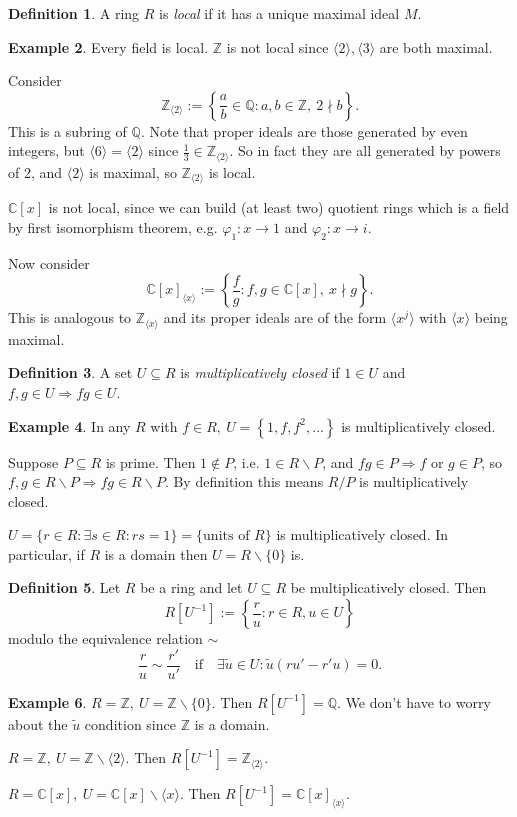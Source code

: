 \documentclass[a4paper]{article}
\newcommand{\la}{\langle}
\newcommand{\ra}{\rangle}
\newcommand{\Z}{\mathbb Z}
\newcommand{\Q}{\mathbb Q}
\newcommand{\C}{\mathbb C}
\theoremstyle{definition}
\newtheorem{defn}{Definition}[subsection]
\newtheorem{example}[defn]{Example}
\begin{document}
\begin{defn}
A ring $R$ is \textit{local} if it has a unique maximal ideal $M$.
\end{defn}
\begin{example}
\label{example:nonexampleLocal}
Every field is local. $\Z$ is not local since $\la2\ra,\la 3\ra$ are both maximal.

Consider
\[
\Z_{\la 2\ra}:=\left\{ \frac{a}{b}\in\Q:a,b\in\Z,\ 2\nmid b \right\}.
\]
This is a subring of $\Q$. Note that proper ideals are those generated by even integers, but $\la 6\ra=\la 2\ra$ since $\frac13 \in \Z_{\la 2\ra}$. So in fact they are all generated by powers of 2, and $\la 2\ra$ is maximal, so $\Z_{\la 2\ra}$ is local.

$\C[x]$ is not local, since we can build (at least two) quotient rings which is a field by first isomorphism theorem, e.g. $\varphi_1 :x\rightarrow 1$ and $\varphi_2 :x\rightarrow i$.

Now consider
\[
\C[x]_{\la x\ra}:= \left\{ \frac{f}{g}:f,g\in\C[x],\ x\nmid g \right\}.
\]
This is analogous to $\Z_{\la x\ra}$ and its proper ideals are of the form $\la x^j\ra$ with $\la x\ra$ being maximal.
\end{example}
\begin{defn}
A set $U\subseteq R$ is \textit{multiplicatively closed} if $1\in U$ and $f,g\in U\Rightarrow fg\in U$.
\end{defn}
\begin{example}
In any $R$ with $f\in R,\ U=\left\{1,f,f^2,\ldots\right\}$ is multiplicatively closed. 

Suppose $P\subseteq R$ is prime. Then $1\notin P$, i.e. $1\in R\backslash P$, and $fg\in P\Rightarrow f$ or $g \in P$, so $f,g\in R\backslash P\Rightarrow fg\in R\backslash P$. By definition this means $R/P$ is multiplicatively closed.

$U=\{r\in R:\exists s\in R:rs=1\}=\{\text{units of }R\}$ is multiplicatively closed. In particular, if $R$ is a domain then $U=R\backslash\{0\}$ is.
\end{example}

\begin{defn}
\label{defn:localisation}
Let $R$ be a ring and let $U\subseteq R$ be multiplicatively closed. Then
\[
R\left[U^{-1}\right]:=\left\{ \frac{r}{u}:r\in R,u\in U \right\}
\]
modulo the equivalence relation $\sim$
\[
\frac{r}{u}\sim\frac{r'}{u'} \quad\text{if}\quad \exists \widetilde u \in U : \widetilde u(ru'-r'u)=0.
\]
\end{defn}
\begin{example}
$R=\Z,\ U=\Z\backslash\{0\}$. Then $R\left[U^{-1}\right]=\Q$. We don't have to worry about the $\widetilde u$ condition since $\Z$ is a domain.

$R=\Z,\ U=\Z\backslash \la 2\ra$. Then $R[U^{-1}]=\Z_{\la 2\ra}$.

$R=\C[x],\ U=\C[x]\backslash \la x\ra$. Then $R[U^{-1}]=\C[x]_{\la x\ra}$.
\end{example}
\end{document}
